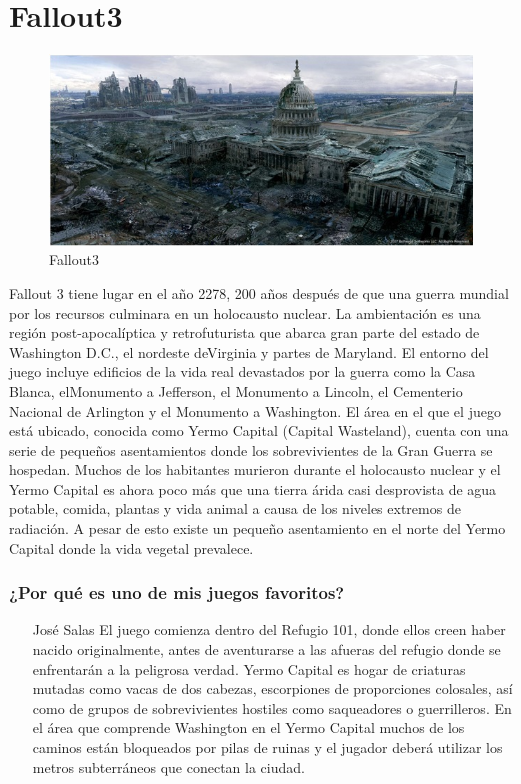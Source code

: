 \section{Fallout3}

\begin{figure}[htbp]
\begin{center}
\includegraphics[width=.60\textwidth]{./imagenes/fallout3.jpg}
\caption{Fallout3}
\label{Fallout3}
\end{center}
\end{figure}
Fallout 3 tiene lugar en el año 2278, 200 años después de que una guerra mundial por los recursos culminara en un holocausto nuclear. La ambientación es una región post-apocalíptica y retrofuturista que abarca gran parte del estado de Washington D.C., el nordeste deVirginia y partes de Maryland. El entorno del juego incluye edificios de la vida real devastados por la guerra como la Casa Blanca, elMonumento a Jefferson, el Monumento a Lincoln, el Cementerio Nacional de Arlington y el Monumento a Washington. El área en el que el juego está ubicado, conocida como Yermo Capital (Capital Wasteland), cuenta con una serie de pequeños asentamientos donde los sobrevivientes de la Gran Guerra se hospedan. Muchos de los habitantes murieron durante el holocausto nuclear y el Yermo Capital es ahora poco más que una tierra árida casi desprovista de agua potable, comida, plantas y vida animal a causa de los niveles extremos de radiación. A pesar de esto existe un pequeño asentamiento en el norte del Yermo Capital donde la vida vegetal prevalece.


\subsubsection{¿Por qué es uno de mis juegos favoritos?}
\begin{itemize}
\item[José Salas] El juego comienza dentro del Refugio 101, donde ellos creen haber nacido originalmente, antes de aventurarse a las afueras del refugio donde se enfrentarán a la peligrosa verdad. Yermo Capital es hogar de criaturas mutadas como vacas de dos cabezas, escorpiones de proporciones colosales, así como de grupos de sobrevivientes hostiles como saqueadores o guerrilleros. En el área que comprende Washington en el Yermo Capital muchos de los caminos están bloqueados por pilas de ruinas y el jugador deberá utilizar los metros subterráneos que conectan la ciudad.

\end{itemize}